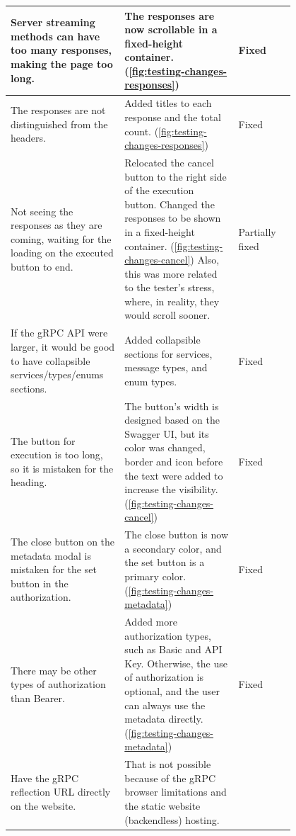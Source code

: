 \begin{table}[!htb]
{\begin{tabular}{|p{0.4\linewidth}|p{0.4\linewidth}|l|}
            \hline
            Server streaming methods can have too many responses, making the page too long.
            & The responses are now scrollable in a fixed-height container.
            (\ref{fig:testing-changes-responses})
            & Fixed \\
            \hline
            The responses are not distinguished from the headers.
            & Added titles to each response and the total count.
            (\ref{fig:testing-changes-responses})
            & Fixed \\
            \hline
            Not seeing the responses as they are coming, waiting for the loading on the executed button to end.
            & Relocated the cancel button to the right side of the execution button.
            Changed the responses to be shown in a fixed-height container.
            (\ref{fig:testing-changes-cancel})
            Also, this was more related to the tester's stress, where, in reality, they would scroll sooner.
            & Partially fixed \\
            \hline
            If the gRPC API were larger, it would be good to have collapsible services/types/enums sections.
            & Added collapsible sections for services, message types, and enum types.
            & Fixed \\
            \hline
            The button for execution is too long, so it is mistaken for the heading.
            & The button's width is designed based on the Swagger UI, but its color was changed, border and icon before the text were added to increase the visibility.
            (\ref{fig:testing-changes-cancel})
            & Fixed \\
            \hline
            The close button on the metadata modal is mistaken for the set button in the authorization.
            & The close button is now a secondary color, and the set button is a primary color.
            (\ref{fig:testing-changes-metadata})
            & Fixed \\
            \hline
            There may be other types of authorization than Bearer.
            & Added more authorization types, such as Basic and API Key.
            Otherwise, the use of authorization is optional, and the user can always use the metadata directly.
            (\ref{fig:testing-changes-metadata})
            & Fixed \\
            \hline
            Have the gRPC reflection URL directly on the website.
            & That is not possible because of the gRPC browser limitations and the static website (backendless) hosting.

\end{tabular}}
\end{table}
